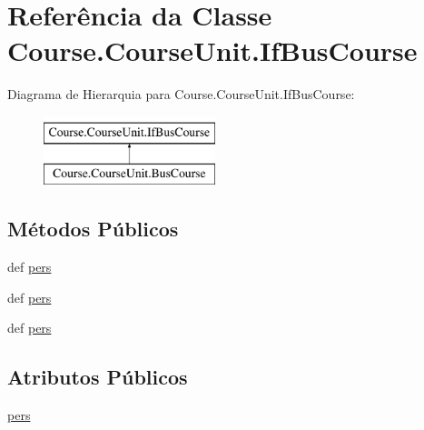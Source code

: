 \hypertarget{classCourse_1_1CourseUnit_1_1IfBusCourse}{\section{Referência da Classe Course.\-Course\-Unit.\-If\-Bus\-Course}
\label{d0/d28/classCourse_1_1CourseUnit_1_1IfBusCourse}
}
Diagrama de Hierarquia para Course.\-Course\-Unit.\-If\-Bus\-Course\-:\begin{figure}[H]
\begin{center}
\leavevmode
\includegraphics[height=2.000000cm]{d0/d28/classCourse_1_1CourseUnit_1_1IfBusCourse}
\end{center}
\end{figure}
\subsection*{Métodos Públicos}
\begin{DoxyCompactItemize}
\item 
def \hyperlink{classCourse_1_1CourseUnit_1_1IfBusCourse_adf5702dec1a99bbb31936b7f1d425a40}{pers}
\item 
def \hyperlink{classCourse_1_1CourseUnit_1_1IfBusCourse_adf5702dec1a99bbb31936b7f1d425a40}{pers}
\item 
def \hyperlink{classCourse_1_1CourseUnit_1_1IfBusCourse_adf5702dec1a99bbb31936b7f1d425a40}{pers}
\end{DoxyCompactItemize}
\subsection*{Atributos Públicos}
\begin{DoxyCompactItemize}
\item 
\hyperlink{classCourse_1_1CourseUnit_1_1IfBusCourse_ab926ae8fb127b7697e2b63025df09a78}{pers}
\end{DoxyCompactItemize}


